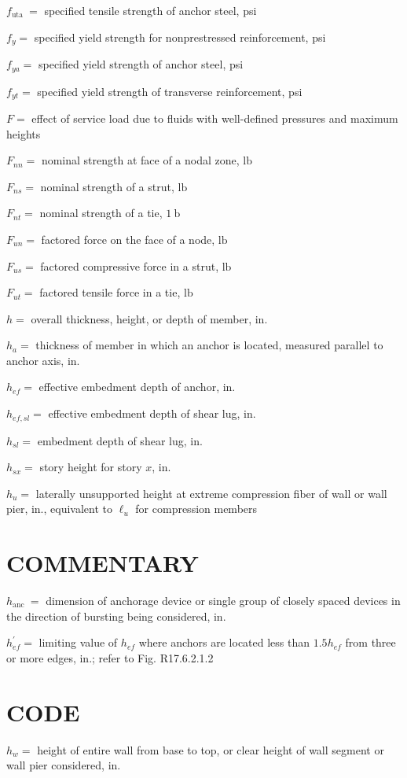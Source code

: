 \documentclass[10pt]{article}
\begin{document}
$f_{\text {uta }}=$ specified tensile strength of anchor steel, psi

$f_{y}=$ specified yield strength for nonprestressed reinforcement, psi

$f_{y a}=$ specified yield strength of anchor steel, psi

$f_{y t}=$ specified yield strength of transverse reinforcement, psi

$F=$ effect of service load due to fluids with well-defined pressures and maximum heights

$F_{n n}=$ nominal strength at face of a nodal zone, $\mathrm{lb}$

$F_{n s}=$ nominal strength of a strut, $\mathrm{lb}$

$F_{n t}=$ nominal strength of a tie, $1 \mathrm{~b}$

$F_{u n}=$ factored force on the face of a node, $\mathrm{lb}$

$F_{u s}=$ factored compressive force in a strut, $\mathrm{lb}$

$F_{u t}=$ factored tensile force in a tie, $\mathrm{lb}$

$h=$ overall thickness, height, or depth of member, in.

$h_{a}=$ thickness of member in which an anchor is located, measured parallel to anchor axis, in.

$h_{e f}=$ effective embedment depth of anchor, in.

$h_{e f, s l}=$ effective embedment depth of shear lug, in.

$h_{s l}=$ embedment depth of shear lug, in.

$h_{s x}=$ story height for story $x$, in.

$h_{u}=$ laterally unsupported height at extreme compression fiber of wall or wall pier, in., equivalent to $\ell_{u}$ for compression members

\section*{COMMENTARY}
$h_{\text {anc }}=$ dimension of anchorage device or single group of closely spaced devices in the direction of bursting being considered, in.

$h_{e f}^{\prime}=$ limiting value of $h_{e f}$ where anchors are located less than $1.5 h_{e f}$ from three or more edges, in.; refer to Fig. R17.6.2.1.2

\section*{CODE}
$h_{w}=$ height of entire wall from base to top, or clear height of wall segment or wall pier considered, in.
\end{document}
